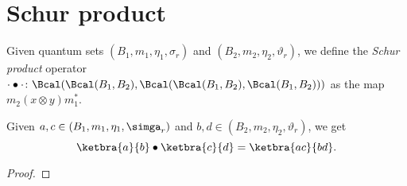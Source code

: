 \chapter{Schur product}

 \begin{definition}\label{schurMul}
  \leanok
  Given quantum sets $(B_1,m_1,\eta_1,\sigma_r)$ and $(B_2,m_2,\eta_2,\vartheta_r)$, we define the \textit{Schur product} operator $\cdot\bullet\cdot\colon\Bcal(\Bcal(B_1,B_2),\Bcal(\Bcal(B_1,B_2),\Bcal(B_1,B_2)))$ as the map $m_2(x\otimes y)m_1^*$.
 \end{definition}

 \begin{lemma}\label{schurMul.apply_rankOne}
  \uses{}
  \leanok
  Given $a,c\in(B_1,m_1,\eta_1,\simga_r)$ and $b,d\in(B_2,m_2,\eta_2,\vartheta_r)$, we get
  \[\ketbra{a}{b}\bullet\ketbra{c}{d}=\ketbra{ac}{bd}.\]
 \end{lemma}
 \begin{proof}
  
 \end{proof}

